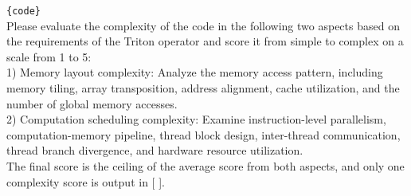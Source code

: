 \begin{tcolorbox}[colframe=gray!80!black, colback=gray!10!white, title=Difficulty Prompt]
\small
\texttt{\{code\}}\\ \justifying %
Please evaluate the complexity of the code in the following two aspects based on the requirements of the Triton operator and score it from simple to complex on a scale from 1 to 5: \\
1) Memory layout complexity: Analyze the memory access pattern, including memory tiling, array transposition, address alignment, cache utilization, and the number of global memory accesses. \\
2) Computation scheduling complexity: Examine instruction-level parallelism, computation-memory pipeline, thread block design, inter-thread communication, thread branch divergence, and hardware resource utilization. \\
The final score is the ceiling of the average score from both aspects, and only one complexity score is output in [ ].
\label{prompt_diff}
\end{tcolorbox}

